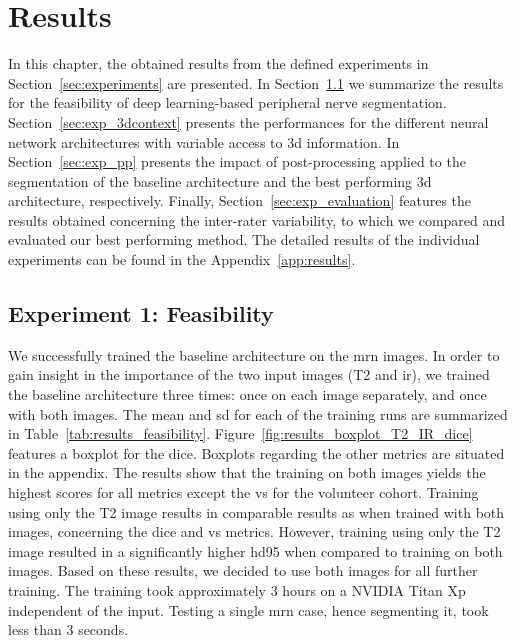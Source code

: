 \chapter{Results} \label{chap:results}
In this chapter, the obtained results from the defined experiments in Section~\ref{sec:experiments} are presented. In Section~\ref{sec:exp_feas} we summarize the results for the feasibility of deep learning-based peripheral nerve segmentation.
Section~\ref{sec:exp_3dcontext} presents the performances for the different neural network architectures with variable access to \gls{3d} information.
In Section~\ref{sec:exp_pp} presents the impact of post-processing applied to the segmentation of the baseline architecture and the best performing \gls{3d} architecture, respectively.
Finally, Section~\ref{sec:exp_evaluation} features the results obtained concerning the inter-rater variability, to which we compared and evaluated our best performing method.
The detailed results of the individual experiments can be found in the Appendix~\ref{app:results}.

\section{Experiment 1: Feasibility} \label{sec:exp_feas} %
We successfully trained the baseline architecture on the \gls{mrn} images. In order to gain insight in the importance of the two input images (T2 and \gls{ir}), we trained the baseline architecture three times: once on each image separately, and once with both images. The mean and \gls{sd} for each of the training runs are summarized in Table~\ref{tab:results_feasibility}. Figure~\ref{fig:results_boxplot_T2_IR_dice} features a boxplot for the \acrlong{dice}. Boxplots regarding the other metrics are situated in the appendix. The results show that the training on both images yields the highest scores for all metrics except the \acrlong{vs} for the volunteer cohort. Training using only the T2 image results in comparable results as when trained with both images, concerning the \gls{dice} and \gls{vs} metrics. However, training using only the T2 image resulted in a significantly higher \gls{hd95} when compared to training on both images. Based on these results, we decided to use both images for all further training. The training took approximately 3 hours on a NVIDIA Titan Xp independent of the input. Testing a single \gls{mrn} case, hence segmenting it, took less than 3 seconds.

